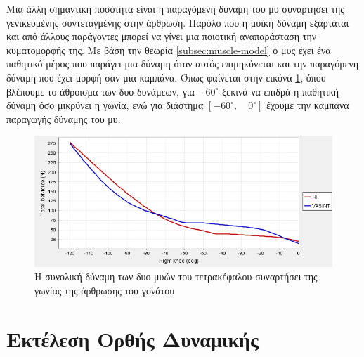 Μια άλλη σημαντική ποσότητα είναι η παραγόμενη δύναμη του μυ συναρτήσει της γενικευμένης συντεταγμένης στην άρθρωση. Παρόλο που η μυϊκή δύναμη εξαρτάται και από άλλους παράγοντες μπορεί να γίνει μια ποιοτική αναπαράσταση την κυματομορφής της. Με βάση την θεωρία \ref{subsec:muscle-model} ο μυς έχει ένα παθητικό μέρος που παράγει μια δύναμη όταν αυτός επιμηκύνεται και την παραγόμενη δύναμη που έχει μορφή σαν μια καμπάνα. Όπως φαίνεται στην εικόνα \ref{fig:total-fiber-force}, όπου βλέπουμε το άθροισμα των δυο δυνάμεων, για $-60^{\circ}$ ξεκινά να επιδρά η παθητική δύναμη όσο μικρύνει η γωνία, ενώ για διάστημα $[-60^{\circ},\quad 0^{\circ}]$ έχουμε την καμπάνα παραγωγής δύναμης του μυ.

\begin{figure}[H]
    \centering
    \includegraphics[width=0.8\linewidth, keepaspectratio]{fig/total-fiber-force.png}
    \caption{Η συνολική δύναμη των δυο μυών του τετρακέφαλου συναρτήσει της γωνίας της άρθρωσης του γονάτου}
    \label{fig:total-fiber-force}
\end{figure}

\section{Εκτέλεση Ορθής Δυναμικής}

